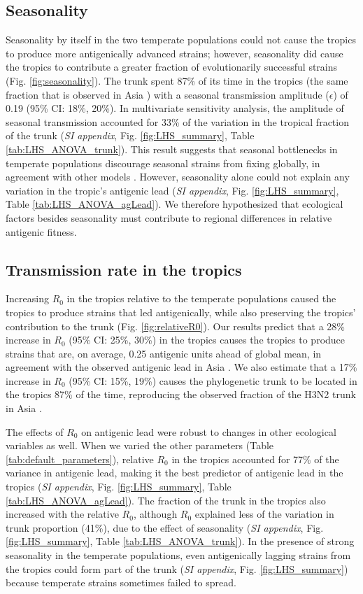 \documentclass[10pt]{article}
\begin{document}
\subsection{Seasonality}
Seasonality by itself in the two temperate populations could not cause the tropics to produce more antigenically advanced strains; however, seasonality did cause the tropics to contribute a greater fraction of evolutionarily successful strains (Fig. \ref{fig:seasonality}). 
The trunk spent 87\% of its time in the tropics (the same fraction that is observed in Asia \cite{Bedford:2015fj}) with a seasonal transmission amplitude ($\epsilon$) of 0.19 (95\% CI: 18\%, 20\%).
In multivariate sensitivity analysis, the amplitude of seasonal transmission accounted for 33\% of the variation in the tropical fraction of the trunk (\textit{SI appendix}, Fig. \ref{fig:LHS_summary}, Table \ref{tab:LHS_ANOVA_trunk}). 
This result suggests that seasonal bottlenecks in temperate populations discourage seasonal strains from fixing globally, in agreement with other models \cite{Adams:2011dh}. 
However, seasonality alone could not explain any variation in the tropic's antigenic lead (\textit{SI appendix}, Fig. \ref{fig:LHS_summary}, Table \ref{tab:LHS_ANOVA_agLead}).
We therefore hypothesized that ecological factors besides seasonality must contribute to regional differences in relative antigenic fitness.

\subsection{Transmission rate in the tropics}
Increasing $R_0$ in the tropics relative to the temperate populations caused the tropics to produce strains that led antigenically, while also preserving the tropics' contribution to the trunk (Fig. \ref{fig:relativeR0}).
Our results predict that a 28\% increase in $R_0$ (95\% CI: 25\%, 30\%) in the tropics causes the tropics to produce strains that are, on average, 0.25 antigenic units ahead of global mean, in agreement with the observed antigenic lead in Asia \cite{Russell:2008ke,Bedford:2014bf}. 
We also estimate that a 17\% increase in $R_0$ (95\% CI: 15\%,  19\%) causes the phylogenetic trunk to be located in the tropics 87\% of the time, reproducing the observed fraction of the H3N2 trunk in Asia \cite{Bedford:2015fj}. 

The effects of $R_0$ on antigenic lead were robust to changes in other ecological variables as well. 
When we varied the other parameters (Table \ref{tab:default_parameters}), relative $R_0$ in the tropics accounted for 77\% of the variance in antigenic lead, making it the best predictor of antigenic lead in the tropics (\textit{SI appendix}, Fig. \ref{fig:LHS_summary}, Table \ref{tab:LHS_ANOVA_agLead}). 
The fraction of the trunk in the tropics also increased with the relative $R_0$, although $R_0$ explained less of the variation in trunk proportion (41\%), due to the effect of seasonality (\textit{SI appendix}, Fig. \ref{fig:LHS_summary}, Table \ref{tab:LHS_ANOVA_trunk}).
In the presence of strong seasonality in the temperate populations, even antigenically lagging strains from the tropics could form part of the trunk (\textit{SI appendix}, Fig. \ref{fig:LHS_summary}) because temperate strains sometimes failed to spread.
\end{document}
